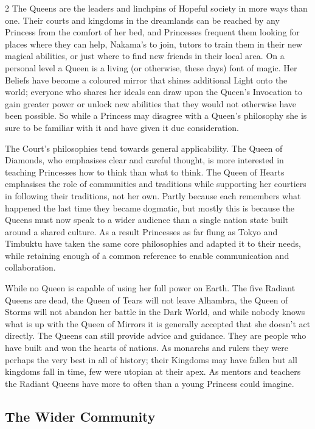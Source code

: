 \begin{multicols}{2}
The Queens are the leaders and linchpins of Hopeful society in more ways than one. Their courts and kingdoms in the dreamlands can be reached by any Princess from the comfort of her bed, and Princesses frequent them looking for places where they can help, Nakama's to join, tutors to train them in their new magical abilities, or just where to find new friends in their local area. On a personal level a Queen is a living (or otherwise, these days) font of magic. Her Beliefs have become a coloured mirror that shines additional Light onto the world; everyone who shares her ideals can draw upon the Queen's Invocation to gain greater power or unlock new abilities that they would not otherwise have been possible. So while a Princess may disagree with a Queen's philosophy she is sure to be familiar with it and have given it due consideration. 

The Court's philosophies tend towards general applicability. The Queen of Diamonds, who emphasises clear and careful thought, is more interested in teaching Princesses how to think than what to think. The Queen of Hearts emphasises the role of communities and traditions while supporting her courtiers in following their traditions, not her own. Partly because each remembers what happened the last time they became dogmatic, but mostly this is because the Queens must now speak to a wider audience than a single nation state built around a shared culture. As a result Princesses as far flung as Tokyo and Timbuktu have taken the same core philosophies and adapted it to their needs, while retaining enough of a common reference to enable communication and collaboration. 

While no Queen is capable of using her full power on Earth. The five Radiant Queens are dead, the Queen of Tears will not leave Alhambra, the Queen of Storms will not abandon her battle in the Dark World, and while nobody knows what is up with the Queen of Mirrors it is generally accepted that she doesn't act directly. The Queens can still provide advice and guidance. They are people who have built and won the hearts of nations. As monarchs and rulers they were perhaps the very best in all of history; their Kingdoms may have fallen but all kingdoms fall in time, few were utopian at their apex. As mentors and teachers the Radiant Queens have more to often than a young Princess could imagine.  

\subsection*{The Wider Community}


\end{multicols}
